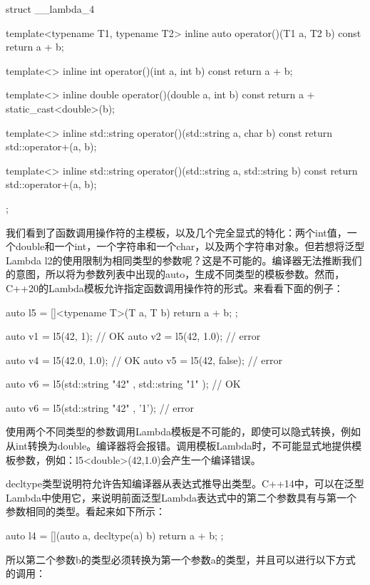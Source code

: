 \begin{cppcode}
struct __lambda_4
{
	template<typename T1, typename T2>
	inline auto operator()(T1 a, T2 b) const
	{
		return a + b;
	}

	template<>
	inline int operator()(int a, int b) const
	{
		return a + b;
	}

	template<>
	inline double operator()(double a, int b) const
	{
		return a + static_cast<double>(b);
	}

	template<>
	inline std::string operator()(std::string a,
	char b) const
	{
		return std::operator+(a, b);
	}

	template<>
	inline std::string operator()(std::string a,
	std::string b) const
	{
		return std::operator+(a, b);
	}
};
\end{cppcode}

我们看到了函数调用操作符的主模板，以及几个完全显式的特化：两个int值，一个double和一个int，一个字符串和一个char，以及两个字符串对象。但若想将泛型Lambda l2的使用限制为相同类型的参数呢？这是不可能的。编译器无法推断我们的意图，所以将为参数列表中出现的auto，生成不同类型的模板参数。然而，C++20的Lambda模板允许指定函数调用操作符的形式。来看看下面的例子：

\begin{cppcode}
auto l5 = []<typename T>(T a, T b) { return a + b; };

auto v1 = l5(42, 1); // OK
auto v2 = l5(42, 1.0); // error

auto v4 = l5(42.0, 1.0); // OK
auto v5 = l5(42, false); // error

auto v6 = l5(std::string{ "42" }, std::string{ "1" }); // OK

auto v6 = l5(std::string{ "42" }, '1'); // error
\end{cppcode}

使用两个不同类型的参数调用Lambda模板是不可能的，即使可以隐式转换，例如从int转换为double。编译器将会报错。调用模板Lambda时，不可能显式地提供模板参数，例如：l5<double>(42,1.0)会产生一个编译错误。

decltype类型说明符允许告知编译器从表达式推导出类型。C++14中，可以在泛型Lambda中使用它，来说明前面泛型Lambda表达式中的第二个参数具有与第一个参数相同的类型。看起来如下所示：

\begin{cppcode}
auto l4 = [](auto a, decltype(a) b) {return a + b; };
\end{cppcode}

所以第二个参数b的类型必须转换为第一个参数a的类型，并且可以进行以下方式的调用：

